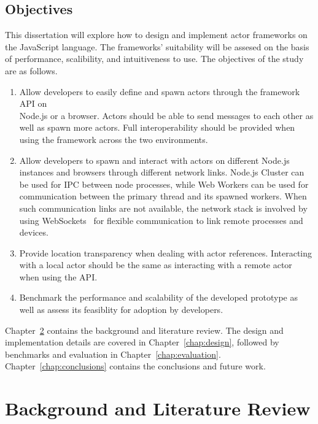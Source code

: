 \documentclass[oneside]{um-fict}
\begin{document}
\section{Objectives}\label{section:objectives}
This dissertation will explore how to design and implement actor frameworks on the JavaScript language. The frameworks' suitability will be assesed on the basis of performance, scalibility, and intuitiveness to use. The objectives of the study are as follows.
\begin{enumerate}
    \item Allow developers to easily define and spawn actors through the framework API on \\Node.js or a browser. Actors should be able to send messages to each other as well as spawn more actors. Full interoperability should be provided when using the framework across the two environments.
    \item Allow developers to spawn and interact with actors on different Node.js instances and browsers through different network links. Node.js Cluster\cite{cluster} can be used for IPC between node processes, while Web Workers\cite{webworkers} can be used for communication between the primary thread and its spawned workers. When such communication links are not available, the network stack is involved by using WebSockets~\cite{websocket} for flexible communication to link remote processes and devices.
    \item Provide location transparency when dealing with actor references. Interacting with a local actor should be the same as interacting with a remote actor when using the API.
    \item Benchmark the performance and scalability of the developed prototype as well as assess its feasiblity for adoption by developers.
\end{enumerate}

Chapter~\ref{chap:background} contains the background and literature review. The design and implementation details are covered in Chapter~\ref{chap:design}, followed by benchmarks and evaluation in Chapter~\ref{chap:evaluation}. Chapter~\ref{chap:conclusions} contains the conclusions and future work.

\chapter{Background and Literature Review}\label{chap:background}
\end{document}
